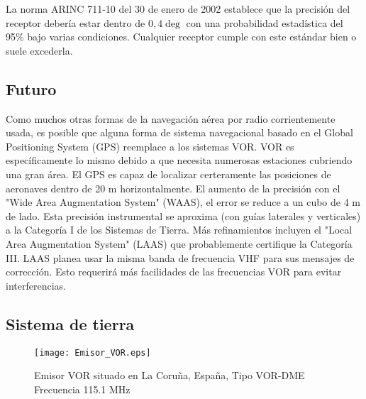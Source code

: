 La norma ARINC 711-10 del 30 de enero de 2002 establece que la precisión del receptor debería estar dentro de $0,4 \deg$ con una probabilidad estadística del 95\% bajo varias condiciones. Cualquier receptor cumple con este estándar bien o suele excederla.

\subsection*{Futuro}
\label{sec:Futuro}

Como muchos otras formas de la navegación aérea por radio corrientemente usada, es posible que alguna forma de sistema navegacional basado en el Global Positioning System (GPS) reemplace a los sistemas VOR. VOR es específicamente lo mismo debido a que necesita numerosas estaciones cubriendo una gran área. El GPS es capaz de localizar certeramente las posiciones de aeronaves dentro de 20 m horizontalmente. El aumento de la precisión con el "Wide Area Augmentation System" (WAAS), el error se reduce a un cubo de 4 m de lado. Esta precisión instrumental se aproxima (con guías laterales y verticales) a la Categoría I de los Sistemas de Tierra. Más refinamientos incluyen el "Local Area Augmentation System" (LAAS) que probablemente certifique la Categoría III. LAAS planea usar la misma banda de frecuencia VHF para sus mensajes de corrección. Esto requerirá más facilidades de las frecuencias VOR para evitar interferencias. 



\subsection*{Sistema de tierra}
\label{Sistema_de_tierra}

\begin{figure}[h]
 	\begin{center}
 		\texttt{[image: Emisor\_VOR.eps]}
	\end{center}
 \caption{Emisor VOR situado en La Coruña, España, Tipo VOR-DME Frecuencia 115.1 MHz 
\cite{EmisorVorLaCoruniaEspania}}
 \label{Emisor_Vor}
\end{figure} 

